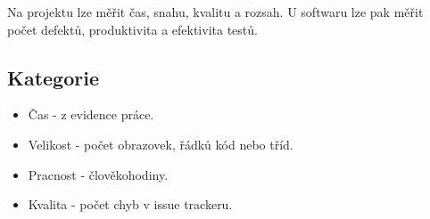       Na projektu lze měřit čas, snahu, kvalitu a rozsah. U softwaru lze pak měřit počet defektů, produktivita a efektivita testů.

      \subsection{Kategorie}
        \begin{itemize}
          \item Čas - z evidence práce.
          \item Velikost - počet obrazovek, řádků kód nebo tříd.
          \item Pracnost - člověkohodiny.
          \item Kvalita - počet chyb v issue trackeru.
        \end{itemize}
